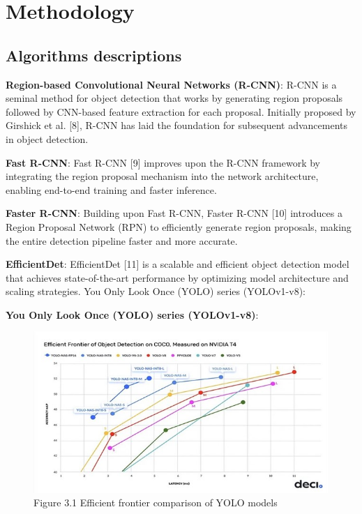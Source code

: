 \chapter{Methodology}
\label{ch:method} %

\section {Algorithms descriptions}
\textbf {Region-based Convolutional Neural Networks (R-CNN)}: R-CNN is a seminal method for object detection that works by generating region proposals followed by CNN-based feature extraction for each proposal. Initially proposed by  Girshick et al. [8], R-CNN has laid the foundation for subsequent advancements in object detection.


\textbf {Fast R-CNN}: Fast R-CNN [9] improves upon the R-CNN framework by integrating the region proposal mechanism into the network architecture, enabling end-to-end training and faster inference.


\textbf {Faster R-CNN}: Building upon Fast R-CNN, Faster R-CNN [10] introduces a Region Proposal Network (RPN) to efficiently generate region proposals, making the entire detection pipeline faster and more accurate.


\textbf {EfficientDet}: EfficientDet [11] is a scalable and efficient object detection model that achieves state-of-the-art performance by optimizing model architecture and scaling strategies.
You Only Look Once (YOLO) series (YOLOv1-v8):

\clearpage
\textbf{You Only Look Once (YOLO) series (YOLOv1-v8)}:
\begin{figure}[ht]
    \centering
    \includegraphics[scale=1.0]{figures/Efficient frointier comparison.jpg}
    \caption{Figure 3.1 Efficient frontier comparison of YOLO models}
    \label{fig:example-01}
\end{figure}

